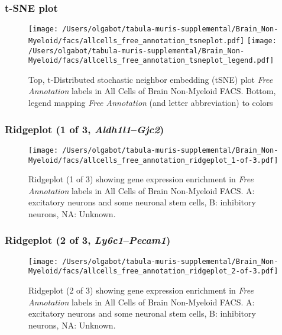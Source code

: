\clearpage
\subsubsection{t-SNE plot}
\begin{figure}[h]
\centering
\texttt{[image: /Users/olgabot/tabula-muris-supplemental/Brain\_Non-Myeloid/facs/allcells\_free\_annotation\_tsneplot.pdf]}
\texttt{[image: /Users/olgabot/tabula-muris-supplemental/Brain\_Non-Myeloid/facs/allcells\_free\_annotation\_tsneplot\_legend.pdf]}
\caption{Top, t-Distributed stochastic neighbor embedding (tSNE) plot  \emph{Free Annotation} labels in All Cells of Brain Non-Myeloid FACS. Bottom, legend mapping \emph{Free Annotation} (and letter abbreviation) to colors}
\end{figure}


\clearpage

\subsubsection{Ridgeplot (1 of 3, \emph{Aldh1l1}--\emph{Gjc2})}
\begin{figure}[h]
\centering
\texttt{[image: /Users/olgabot/tabula-muris-supplemental/Brain\_Non-Myeloid/facs/allcells\_free\_annotation\_ridgeplot\_1-of-3.pdf]}

\caption{ Ridgeplot (1 of 3)  showing gene expression enrichment in \emph{Free Annotation} labels in All Cells of Brain Non-Myeloid FACS. A: excitatory neurons and some neuronal stem cells, B: inhibitory neurons, NA: Unknown.}
\end{figure}


\clearpage

\subsubsection{Ridgeplot (2 of 3, \emph{Ly6c1}--\emph{Pecam1})}
\begin{figure}[h]
\centering
\texttt{[image: /Users/olgabot/tabula-muris-supplemental/Brain\_Non-Myeloid/facs/allcells\_free\_annotation\_ridgeplot\_2-of-3.pdf]}

\caption{ Ridgeplot (2 of 3)  showing gene expression enrichment in \emph{Free Annotation} labels in All Cells of Brain Non-Myeloid FACS. A: excitatory neurons and some neuronal stem cells, B: inhibitory neurons, NA: Unknown.}
\end{figure}


\clearpage

